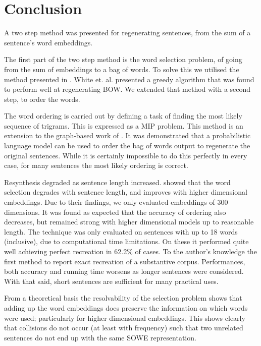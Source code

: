 \documentclass[11pt]{article}
\theoremstyle{plain}
\theoremstyle{definition}
\newcommand{\textcite}{\protect\newcite}
\begin{document}
\section{Conclusion} \label{conclusion}
A two step method was presented for regenerating sentences, from the sum of a sentence's word embeddings. 

The first part of the two step method is  the word selection problem, of going from the sum of embeddings to a bag of words. To solve this we utilised the method presented in \textcite{White2015BOWgen}. White et. al. presented a greedy algorithm that was found to perform well at regenerating BOW. We extended that method with a second step, to order the words.

The word ordering is carried out by defining a task of finding the most likely sequence of trigrams. This is expressed as a MIP problem. This method is an extension to the graph-based work of \textcite{Horvat2014}. It was demonstrated that a probabilistic language model can be used to order the bag of words output to regenerate the original sentences. While it is certainly impossible to do this perfectly in every case, for many sentences the most likely ordering is correct.

Resynthesis degraded as sentence length increased. \textcite{White2015BOWgen} showed that the word selection degrades with sentence length, and improves with higher dimensional embeddings. Due to their findings, we only evaluated embeddings of 300 dimensions. It was found as expected that the accuracy of ordering also decreases, but remained strong with higher dimensional models up to reasonable length. The technique was only evaluated on sentences with up to 18 words (inclusive), due to computational time limitations. On these it performed quite well achieving perfect recreation in 62.2\% of cases. To the author's knowledge the first method to report exact recreation of a substantive corpus. Performances, both accuracy and running time worsens as  longer sentences were considered. With that said, short sentences are sufficient for many practical uses.

From a theoretical basis the resolvability of the selection problem shows that adding up the word embeddings does preserve the information on which words were used; particularly for higher dimensional embeddings. This shows clearly that collisions do not occur (at least with frequency) such that two unrelated sentences do not end up with the same SOWE representation. 



\end{document}
